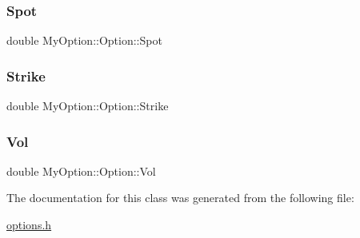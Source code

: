 \hypertarget{classMyOption_1_1Option_a6c6f01d75cde7e92d16a6d8d6f331a1d}{}\label{classMyOption_1_1Option_a6c6f01d75cde7e92d16a6d8d6f331a1d} 
\subsubsection{\texorpdfstring{Spot}{Spot}}
{\footnotesize\ttfamily double My\+Option\+::\+Option\+::\+Spot\hspace{0.3cm}{\ttfamily [protected]}}

\hypertarget{classMyOption_1_1Option_a3033c483588ce26b175280c7f9dee8d1}{}\label{classMyOption_1_1Option_a3033c483588ce26b175280c7f9dee8d1} 
\subsubsection{\texorpdfstring{Strike}{Strike}}
{\footnotesize\ttfamily double My\+Option\+::\+Option\+::\+Strike\hspace{0.3cm}{\ttfamily [protected]}}

\hypertarget{classMyOption_1_1Option_a5d6002c14b335c782873bf1437113513}{}\label{classMyOption_1_1Option_a5d6002c14b335c782873bf1437113513} 
\subsubsection{\texorpdfstring{Vol}{Vol}}
{\footnotesize\ttfamily double My\+Option\+::\+Option\+::\+Vol\hspace{0.3cm}{\ttfamily [protected]}}



The documentation for this class was generated from the following file\+:\begin{DoxyCompactItemize}
\item 
\hyperlink{options_8h}{options.\+h}\end{DoxyCompactItemize}
